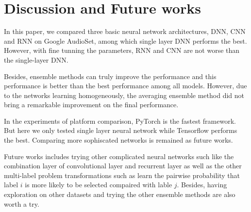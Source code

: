 \documentclass{article}
\begin{document}
	\section{Discussion and Future works}\label{sec:discuss}
		In this paper, we compared three basic neural network architectures, DNN, CNN and RNN on Google AudioSet, among which single layer DNN performs the best. However, with fine tunning the parameters, RNN and CNN are not worse than the single-layer DNN. 

		Besides, ensemble methods can truly improve the performance and this performance is better than the best performance among all models. However, due to the networks learning homogeneously, the averaging ensemble method did not bring a remarkable improvement on the final performance.

		In the experiments of platform comparison, PyTorch is the fastest framework. But here we only tested single layer neural network while Tensorflow performs the best. Comparing more sophiscated networks is remained as future works.

		Future works includes trying other complicated neural networks such like the combination layer of convolutional layer and recurrent layer as well as the other multi-label problem transformations such as learn the pairwise probability that label $i$ is more likely to be selected compaired with lable $j$. Besides, having exploration on other datasets and trying the other ensemble methods are also worth a try.

	\newpage
	
	
\end{document}
